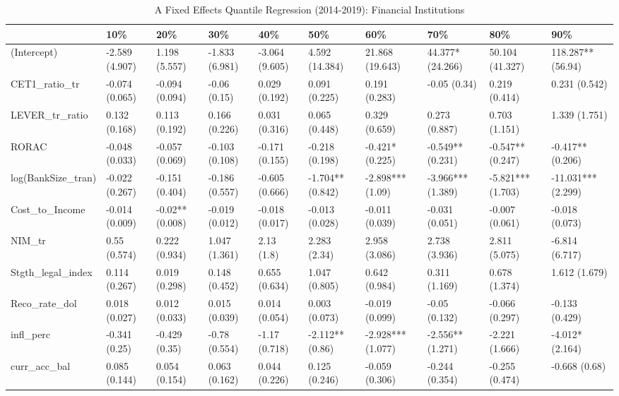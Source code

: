 \begin{table}[ht]
\centering
\caption{A Fixed Effects Quantile Regression (2014-2019): Financial Institutions} 
\begingroup\small
\begin{tabular}{llllllllll}
  \toprule
 & 10\% & 20\% & 30\% & 40\% & 50\% & 60\% & 70\% & 80\% & 90\% \\ 
  \midrule
(Intercept) & -2.589 (4.907) & 1.198 (5.557) & -1.833 (6.981) & -3.064 (9.605) & 4.592 (14.384) & 21.868 (19.643) & 44.377* (24.266) & 50.104 (41.327) & 118.287** (56.94) \\ 
  CET1\_ratio\_tr & -0.074 (0.065) & -0.094 (0.094) & -0.06 (0.15) & 0.029 (0.192) & 0.091 (0.225) & 0.191 (0.283) & -0.05 (0.34) & 0.219 (0.414) & 0.231 (0.542) \\ 
  LEVER\_tr\_ratio & 0.132 (0.168) & 0.113 (0.192) & 0.166 (0.226) & 0.031 (0.316) & 0.065 (0.448) & 0.329 (0.659) & 0.273 (0.887) & 0.703 (1.151) & 1.339 (1.751) \\ 
  RORAC & -0.048 (0.033) & -0.057 (0.069) & -0.103 (0.108) & -0.171 (0.155) & -0.218 (0.198) & -0.421* (0.225) & -0.549** (0.231) & -0.547** (0.247) & -0.417** (0.206) \\ 
  log(BankSize\_tran) & -0.022 (0.267) & -0.151 (0.404) & -0.186 (0.557) & -0.605 (0.666) & -1.704** (0.842) & -2.898*** (1.09) & -3.966*** (1.389) & -5.821*** (1.703) & -11.031*** (2.299) \\ 
  Cost\_to\_Income & -0.014 (0.009) & -0.02** (0.008) & -0.019 (0.012) & -0.018 (0.017) & -0.013 (0.028) & -0.011 (0.039) & -0.031 (0.051) & -0.007 (0.061) & -0.018 (0.073) \\ 
  NIM\_tr & 0.55 (0.574) & 0.222 (0.934) & 1.047 (1.361) & 2.13 (1.8) & 2.283 (2.34) & 2.958 (3.086) & 2.738 (3.936) & 2.811 (5.075) & -6.814 (6.717) \\ 
  Stgth\_legal\_index & 0.114 (0.267) & 0.019 (0.298) & 0.148 (0.452) & 0.655 (0.634) & 1.047 (0.805) & 0.642 (0.984) & 0.311 (1.169) & 0.678 (1.374) & 1.612 (1.679) \\ 
  Reco\_rate\_dol & 0.018 (0.027) & 0.012 (0.033) & 0.015 (0.039) & 0.014 (0.054) & 0.003 (0.073) & -0.019 (0.099) & -0.05 (0.132) & -0.066 (0.297) & -0.133 (0.429) \\ 
  infl\_perc & -0.341 (0.25) & -0.429 (0.35) & -0.78 (0.554) & -1.17 (0.718) & -2.112** (0.86) & -2.928*** (1.077) & -2.556** (1.271) & -2.221 (1.666) & -4.012* (2.164) \\ 
  curr\_acc\_bal & 0.085 (0.144) & 0.054 (0.154) & 0.063 (0.162) & 0.044 (0.226) & 0.125 (0.246) & -0.059 (0.306) & -0.244 (0.354) & -0.255 (0.474) & -0.668 (0.68) \\ 

\end{tabular}
\end{table}

